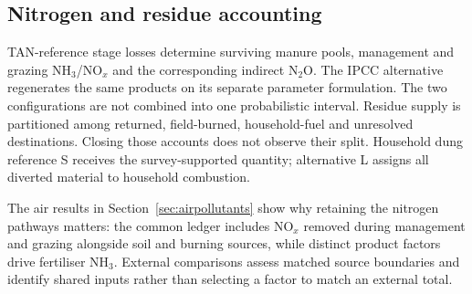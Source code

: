 \subsection{Nitrogen and residue accounting}\label{sec:results-nledger}
TAN-reference stage losses determine surviving manure pools, management and grazing NH$_3$/NO$_x$ and the corresponding indirect N$_2$O. The IPCC alternative regenerates the same products on its separate parameter formulation. The two configurations are not combined into one probabilistic interval. Residue supply is partitioned among returned, field-burned, household-fuel and unresolved destinations. Closing those accounts does not observe their split. Household dung reference S receives the survey-supported quantity; alternative L assigns all diverted material to household combustion.

The air results in Section~\ref{sec:airpollutants} show why retaining the nitrogen pathways matters: the common ledger includes NO$_x$ removed during management and grazing alongside soil and burning sources, while distinct product factors drive fertiliser NH$_3$. External comparisons assess matched source boundaries and identify shared inputs rather than selecting a factor to match an external total.
